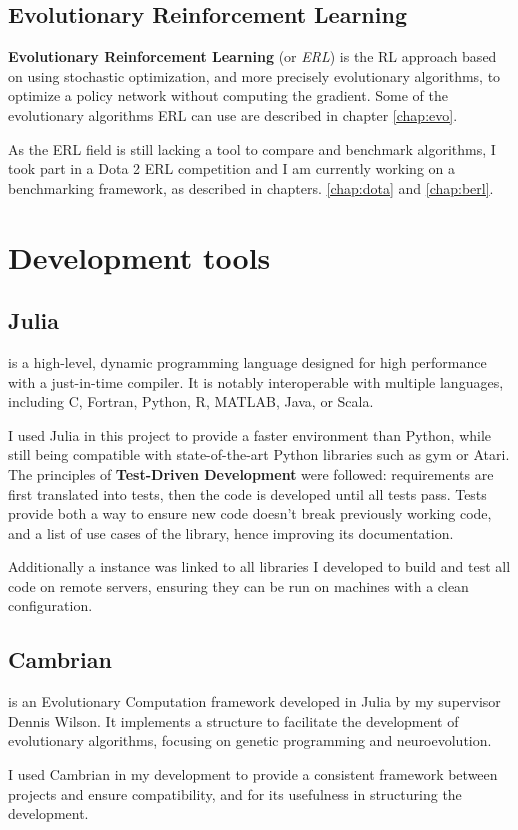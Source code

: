 \subsection{Evolutionary Reinforcement Learning}
\label{sec:ERL}

\textbf{Evolutionary Reinforcement Learning} (or \textit{ERL}) is the RL approach based on using stochastic optimization, and more precisely evolutionary algorithms, to optimize a policy network without computing the gradient. Some of the evolutionary algorithms ERL can use are described in chapter \ref{chap:evo}.

As the ERL field is still lacking a tool to compare and benchmark algorithms, I took part in a Dota 2 ERL competition and I am currently working on a benchmarking framework, as described in chapters. \ref{chap:dota} and \ref{chap:berl}.

\section{Development tools}
\subsection{Julia}
    
 is a high-level, dynamic programming language designed for high performance with a just-in-time compiler. It is notably interoperable with multiple languages, including C, Fortran, Python, R, MATLAB, Java, or Scala. \cite{julia-lang}

I used Julia in this project to provide a faster environment than Python, while still being compatible with state-of-the-art Python libraries such as gym or Atari.
\\

The principles of \textbf{Test-Driven Development} were followed: requirements are first translated into tests, then the code is developed until all tests pass. Tests provide both a way to ensure new code doesn't break previously working code, and a list of use cases of the library, hence improving its documentation.

Additionally a  instance was linked to all libraries I developed to build and test all code on remote servers, ensuring they can be run on machines with a clean configuration. 

\subsection{Cambrian}

 is an Evolutionary Computation framework developed in Julia by my supervisor Dennis Wilson. It implements a structure to facilitate the development of evolutionary algorithms, focusing on genetic programming and neuroevolution. 

I used Cambrian in my development to provide a consistent framework between projects and ensure compatibility, and for its usefulness in structuring the development.

